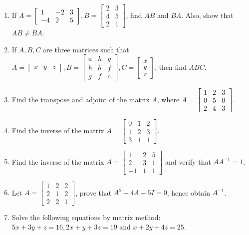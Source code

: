 \begin{enumerate}
\item If $A = \begin{bmatrix}1 & -2 & 3 \\ -4 & 2 & 5\end{bmatrix}, B = \begin{bmatrix}2 & 3 \\ 4 & 5 \\ 2 & 1\end{bmatrix}$, find
    $AB$ and $BA$. Also, show that $AB\neq BA$.
\item If $A, B, C$ are three matrices such that $A = \begin{bmatrix}x & y & z\end{bmatrix}, B = \begin{bmatrix}a & h & g\\h & b & f
    \\ g & f & c\end{bmatrix}, C = \begin{bmatrix}x \\ y \\ z\end{bmatrix}$, then find $ABC$.
\item Find the transpose and adjoint of the matrix $A$, where $A =    \begin{bmatrix}1 & 2 & 3\\0 & 5 & 0\\2 & 4 &
  3\end{bmatrix}$.
\item Find the inverse of the matrix $A = \begin{bmatrix}0 & 1 & 2\\1 & 2 & 3\\3 & 1 & 1\end{bmatrix}$.
\item Find the inverse of the matrix $A= \begin{bmatrix}1 & 2 & 5\\2 & 3 & 1\\-1 & 1 & 1\end{bmatrix}$ and verify that $AA^{-1} =
  1$.
\item Let $A = \begin{bmatrix}1 & 2 & 2\\2 & 1 & 2\\2 & 2 & 1\end{bmatrix}$, prove that $A^2-4A-5I = 0$, hence obtain $A^{-1}$.
\item Solve the following equations by matrix method: $5x + 3y +z = 16, 2x + y + 3z = 19 \text{~and~}x + 2y + 4z = 25$.

\end{enumerate}
